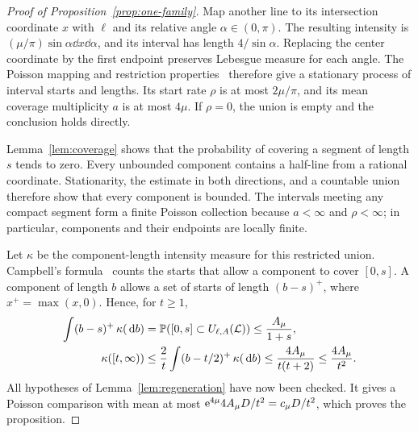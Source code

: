 \documentclass[11pt,letterpaper]{article}
\begin{document}
\begin{proof}[Proof of Proposition~\ref{prop:one-family}]
Map another line to its intersection coordinate $x$ with $\ell$ and its relative angle $\alpha\in(0,\pi)$. The resulting intensity is $(\mu/\pi)\sin\alpha\dd x\dd\alpha$, and its interval has length $4/\sin\alpha$. Replacing the center coordinate by the first endpoint preserves Lebesgue measure for each angle. The Poisson mapping and restriction properties~\cite[Section~5.1]{LP17} therefore give a stationary process of interval starts and lengths. Its start rate $\rho$ is at most $2\mu/\pi$, and its mean coverage multiplicity $a$ is at most $4\mu$. If $\rho=0$, the union is empty and the conclusion holds directly.

Lemma~\ref{lem:coverage} shows that the probability of covering a segment of length $s$ tends to zero. Every unbounded component contains a half-line from a rational coordinate. Stationarity, the estimate in both directions, and a countable union therefore show that every component is bounded. The intervals meeting any compact segment form a finite Poisson collection because $a<\infty$ and $\rho<\infty$; in particular, components and their endpoints are locally finite.

Let $\kappa$ be the component-length intensity measure for this restricted union. Campbell's formula~\cite[Section~2.2]{LP17} counts the starts that allow a component to cover $[0,s]$. A component of length $b$ allows a set of starts of length $(b-s)^+$, where $x^+=\max(x,0)$. Hence, for $t\ge1$,
\begin{equation}\label{eq:kappa}
\begin{aligned}
 \int(b-s)^+\,\kappa(\,\mathrm{d} b)
   &=\mathbb P([0,s]\subset U_{\ell,A}(\mathcal L))\le\frac{A_\mu}{1+s},\\
 \kappa([t,\infty))
   &\le\frac2t\int(b-t/2)^+\,\kappa(\,\mathrm{d} b)
    \le\frac{4A_\mu}{t(t+2)}\le\frac{4A_\mu}{t^2}.
\end{aligned}
\end{equation}
All hypotheses of Lemma~\ref{lem:regeneration} have now been checked. It gives a Poisson comparison with mean at most $\mathrm{e}^{4\mu}4A_\mu D/t^2=c_\mu D/t^2$, which proves the proposition.
\end{proof}
\end{document}
